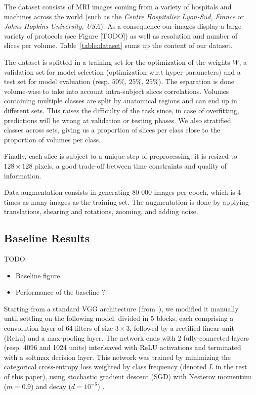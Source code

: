 The dataset consists of MRI images coming from a variety of hospitals and machines across the world (such as the \textit{Centre Hospitalier Lyon-Sud, France} or \textit{ Johns Hopkins University, USA}). As a consequence our images display a large variety of protocols (see Figure [TODO]) as well as resolution and number of slices per volume. Table~\ref{table:dataset} sums up the content of our dataset.

The dataset is splitted in a training set for the optimization of the weights $W$, a validation set for model selection (optimization w.r.t hyper-parameters) and a test set for model evaluation (resp. $50 \%$, $25 \%$, $25 \%$). The separation is done volume-wise to take into account intra-subject slices correlations. Volumes containing multiple classes are split by anatomical regions and can end up in different sets. This raises the difficulty of the task since, in case of overfitting, predictions will be wrong at validation or testing phases.
We also stratified classes across sets, giving us a proportion of slices per class close to the proportion of volumes per class.

Finally, each slice is subject to a unique step of preprocessing: it is resized to $128 \times 128$ pixels, a good trade-off between time constraints and quality of information.

Data augmentation consists in generating 80 000 images per epoch, which is 4 times as many images as the training set. The augmentation is done by applying translations, shearing and rotations, zooming, and adding noise.

\subsection{Baseline Results}

TODO:
\begin{itemize}
    \item Baseline figure
    \item Performance of the baseline ?
\end{itemize}

Starting from a standard VGG architecture (from~\textcite{simonyan2014}), we modified it manually until settling on the following model: divided in 5 blocks, each comprising a convolution layer of 64 filters of size $3\times 3$, followed by a rectified linear unit (ReLu) and a max-pooling layer. The network ends with 2 fully-connected layers (resp. 4096 and 1024 units) interleaved with ReLU activations and terminated with a softmax decision layer. This network was trained by minimizing the categorical cross-entropy loss weighted by class frequency (denoted $L$ in the rest of this paper), using stochastic gradient descent (SGD) with Nesterov momentum ($m = 0.9$) and decay ($d = 10^{-6}$) .

